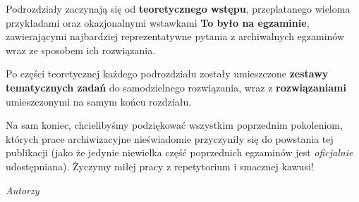 Podrozdziały zaczynają się od \textbf{teoretycznego wstępu}, przeplatanego wieloma przykładami oraz okazjonalnymi wstawkami {\sffamily\bfseries To było na egzaminie}, zawierającymi najbardziej reprezentatywne pytania z archiwalnych egzaminów wraz ze sposobem ich rozwiązania.

Po części teoretycznej każdego podrozdziału zostały umieszczone \textbf{zestawy tematycznych zadań} do samodzielnego rozwiązania, wraz z \textbf{rozwiązaniami} umieszczonymi na samym końcu rozdziału. 

\bigskip
Na sam koniec, chcielibyśmy podziękować wszystkim poprzednim pokoleniom, których prace archiwizacyjne nieświadomie przyczyniły się do powstania tej publikacji (jako że jedynie niewielka część poprzednich egzaminów jest \textit{oficjalnie} udostępniana). Życzymy miłej pracy z repetytorium i smacznej kawusi!

\begin{flushright}
\textit{Autorzy}
\end{flushright}